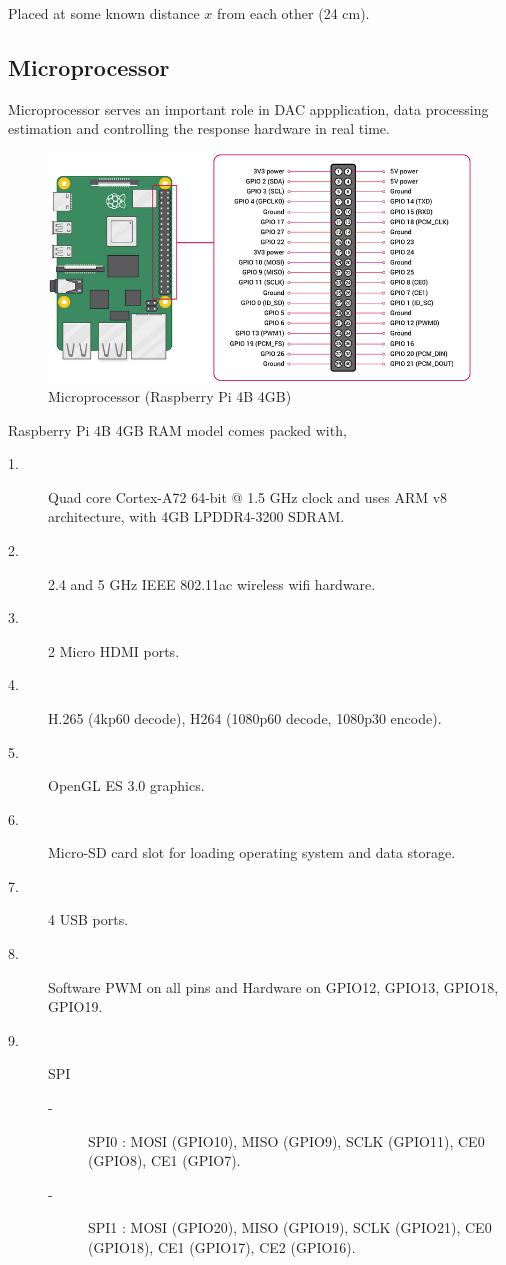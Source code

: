 \documentclass[twocolumn]{report}
\begin{document}
Placed at some known distance \(x \) from each other (24 cm).

\subsection{Microprocessor}

Microprocessor serves an important role in DAC appplication, data processing estimation 
and controlling the response hardware in real time.

\begin{figure}[h]
    \includegraphics[width=\columnwidth]{raspberry_pi.png}
    \caption{Microprocessor (Raspberry Pi 4B 4GB)}
\end{figure}

Raspberry Pi 4B 4GB RAM model comes packed with, 

\begin{description}
    \item[1.]Quad core Cortex-A72 64-bit @ 1.5 GHz clock and uses ARM v8 architecture, 
    with 4GB LPDDR4-3200 SDRAM.
    \item[2.]2.4 and 5 GHz IEEE 802.11ac wireless wifi hardware.
    \item[3.]2 Micro HDMI ports.
    \item[4.]H.265 (4kp60 decode), H264 (1080p60 decode, 1080p30 encode).
    \item[5.]OpenGL ES 3.0 graphics.
    \item[6.]Micro-SD card slot for loading operating system and data storage.
    \item[7.]4 USB ports.
    \item[8.]Software PWM on all pins and Hardware on GPIO12, GPIO13, GPIO18, GPIO19.
    \item[9.]SPI
    \begin{description}
        \item[-]SPI0 : MOSI (GPIO10), MISO (GPIO9), SCLK (GPIO11), CE0 (GPIO8), CE1 (GPIO7).
        \item[-]SPI1 : MOSI (GPIO20), MISO (GPIO19), SCLK (GPIO21), CE0 (GPIO18), CE1 (GPIO17), CE2 (GPIO16).  
    \end{description}  
\end{description}
\end{document}
